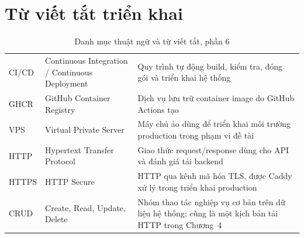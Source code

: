 \section*{Từ viết tắt triển khai}

\begingroup
\setlength{\tabcolsep}{2pt}
\renewcommand{\arraystretch}{1.2}
\begin{longtable}{|C{0.16\textwidth}|P{0.22\textwidth}|P{0.55\textwidth}|}  \caption{Danh mục thuật ngữ và từ viết tắt, phần 6}\\
  \hline
       &        &     \\ \hline
  CI/CD     &     Continuous Integration / Continuous Deployment     &     Quy trình tự động build, kiểm tra, đóng gói và triển khai hệ thống \\ \hline
  GHCR      &      GitHub Container Registry      &      Dịch vụ lưu trữ container image do GitHub Actions tạo \\ \hline
  VPS     &     Virtual Private Server     &     Máy chủ ảo dùng để triển khai môi trường production trong phạm vi đề tài \\ \hline
  HTTP      &      Hypertext Transfer Protocol      &      Giao thức request/response dùng cho API và đánh giá tải backend \\ \hline
  HTTPS     &     HTTP Secure     &     HTTP qua kênh mã hóa TLS, được Caddy xử lý trong triển khai production \\ \hline
  CRUD      &      Create, Read, Update, Delete      &      Nhóm thao tác nghiệp vụ cơ bản trên dữ liệu hệ thống; cũng là một kịch bản tải HTTP trong Chương~4 \\ \hline
\end{longtable}
\endgroup

